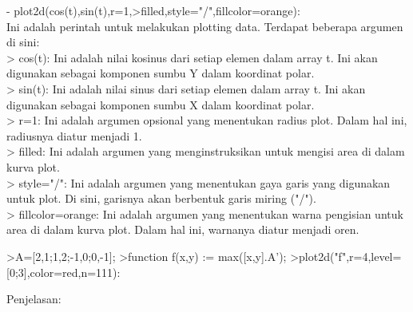 \documentclass[a4paper,10pt]{article}
\begin{document}
\begin{eulernotebook}
\begin{eulercomment}
\begin{eulercomment}
\begin{eulercomment}
\begin{eulercomment}
\begin{eulercomment}
\begin{eulercomment}
\begin{eulercomment}
\begin{eulercomment}
\begin{eulercomment}
\begin{eulercomment}
\begin{eulercomment}
\begin{eulercomment}
\begin{eulercomment}
- plot2d(cos(t),sin(t),r=1,\textgreater{}filled,style="/",fillcolor=orange):\\
Ini adalah perintah untuk melakukan plotting data. Terdapat beberapa
argumen di sini:\\
\textgreater{} cos(t): Ini adalah nilai kosinus dari setiap elemen dalam array t.
Ini akan digunakan sebagai komponen sumbu Y dalam koordinat polar.\\
\textgreater{} sin(t): Ini adalah nilai sinus dari setiap elemen dalam array t. Ini
akan digunakan sebagai komponen sumbu X dalam koordinat polar.\\
\textgreater{} r=1: Ini adalah argumen opsional yang menentukan radius plot. Dalam
hal ini, radiusnya diatur menjadi 1.\\
\textgreater{} filled: Ini adalah argumen yang menginstruksikan untuk mengisi area
di dalam kurva plot.\\
\textgreater{} style="/": Ini adalah argumen yang menentukan gaya garis yang
digunakan untuk plot. Di sini, garisnya akan berbentuk garis miring
("/").\\
\textgreater{} fillcolor=orange: Ini adalah argumen yang menentukan warna pengisian
untuk area di dalam kurva plot. Dalam hal ini, warnanya diatur menjadi
oren.

\end{eulercomment}
\begin{eulerprompt}
>A=[2,1;1,2;-1,0;0,-1];
>function f(x,y) := max([x,y].A');
>plot2d("f",r=4,level=[0;3],color=red,n=111):
\end{eulerprompt}
\begin{eulercomment}
Penjelasan:


\end{eulercomment}
\end{eulercomment}
\end{eulercomment}
\end{eulercomment}
\end{eulercomment}
\end{eulercomment}
\end{eulercomment}
\end{eulercomment}
\end{eulercomment}
\end{eulercomment}
\end{eulercomment}
\end{eulercomment}
\end{eulercomment}
\end{eulernotebook}
\end{document}
